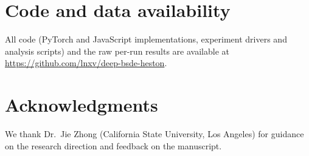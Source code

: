 \section*{Code and data availability}
All code (PyTorch and JavaScript implementations, experiment drivers and analysis scripts) and the raw per-run results are available at \url{https://github.com/lnxv/deep-bsde-heston}.

\section*{Acknowledgments}
We thank Dr.\ Jie Zhong (California State University, Los Angeles) for guidance on the research direction and feedback on the manuscript.





